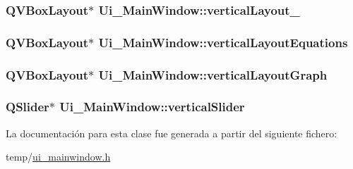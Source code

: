 \subsubsection[{\texorpdfstring{vertical\+Layout\+\_\+8}{verticalLayout_8}}]{\setlength{\rightskip}{0pt plus 5cm}Q\+V\+Box\+Layout$\ast$ Ui\+\_\+\+Main\+Window\+::vertical\+Layout\+\_}\hypertarget{class_ui___main_window_aaa8cc393d5a44562d629a9f646d2c6dd}{}\label{class_ui___main_window_aaa8cc393d5a44562d629a9f646d2c6dd}
\subsubsection[{\texorpdfstring{vertical\+Layout\+Equations}{verticalLayoutEquations}}]{\setlength{\rightskip}{0pt plus 5cm}Q\+V\+Box\+Layout$\ast$ Ui\+\_\+\+Main\+Window\+::vertical\+Layout\+Equations}\hypertarget{class_ui___main_window_a6726aa72a4b420b44c48acdf85c7317d}{}\label{class_ui___main_window_a6726aa72a4b420b44c48acdf85c7317d}
\subsubsection[{\texorpdfstring{vertical\+Layout\+Graph}{verticalLayoutGraph}}]{\setlength{\rightskip}{0pt plus 5cm}Q\+V\+Box\+Layout$\ast$ Ui\+\_\+\+Main\+Window\+::vertical\+Layout\+Graph}\hypertarget{class_ui___main_window_a5fd4b18ed282c1cda8a8e488a4068aea}{}\label{class_ui___main_window_a5fd4b18ed282c1cda8a8e488a4068aea}
\subsubsection[{\texorpdfstring{vertical\+Slider}{verticalSlider}}]{\setlength{\rightskip}{0pt plus 5cm}Q\+Slider$\ast$ Ui\+\_\+\+Main\+Window\+::vertical\+Slider}\hypertarget{class_ui___main_window_acc5d089772e8cdc8c53b20e42b7d80bc}{}\label{class_ui___main_window_acc5d089772e8cdc8c53b20e42b7d80bc}


La documentación para esta clase fue generada a partir del siguiente fichero\+:\begin{DoxyCompactItemize}
\item 
temp/\hyperlink{ui__mainwindow_8h}{ui\+\_\+mainwindow.\+h}\end{DoxyCompactItemize}

